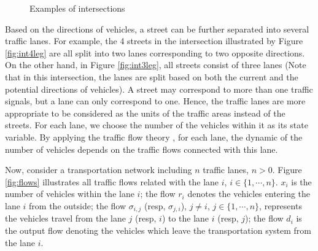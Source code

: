 \documentclass[preprint,authoryear,12pt]{elsarticle}
\begin{document}
\begin{figure}[ht]
  \centering
  \quad
  \caption{Examples of intersections}
\end{figure}

Based on the directions of vehicles, a street can be further
separated into several traffic lanes. For example, the 4 streets in
the intersection illustrated by Figure \ref{fig:int4leg} are all
split into two lanes corresponding to two opposite directions. On the
other hand, in Figure \ref{fig:int3leg}, all streets  consist of
three lanes (Note that in this intersection, the lanes are split
based on both the current and the potential directions of vehicles).
A street may correspond to more than one traffic signals, but a lane
can only correspond to one. Hence, the traffic lanes are more
appropriate to be considered as the units of the traffic areas
instead of the streets. For each lane, we choose the number of the
vehicles within it as its state variable. By applying the traffic
flow theory \citep{nathan_h_gartner_revised_2005}, for each lane, the
dynamic of the number of vehicles depends on the traffic flows
connected with this lane.

Now, consider a transportation network including $n$ traffic lanes,
$n>0$. Figure \ref{fig:flows} illustrates all traffic flows related
with the lane $i$, $i\in\{1,\cdots,n\}$. $x_i$ is the number of
vehicles within the lane $i$; the flow $r_i$ denotes the vehicles
entering the lane $i$ from the outside; the flow $\sigma_{i,j}$
(resp, $\sigma_{j,i}$), $j\neq i$, $j\in\{1,\cdots,n\}$, represents
the vehicles travel from the lane $j$ (resp, $i$) to the lane $i$
(resp, $j$); the flow $d_{i}$ is the output flow denoting the
vehicles which leave the transportation system from the lane $i$.
\end{document}
